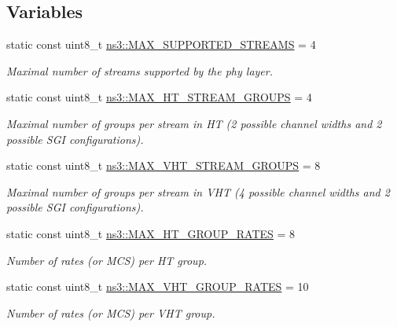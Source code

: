 \subsection*{Variables}
\begin{DoxyCompactItemize}
\item 
static const uint8\+\_\+t \hyperlink{namespacens3_ae11d9ba4764a3d93a0e9a15c40c94db1}{ns3\+::\+M\+A\+X\+\_\+\+S\+U\+P\+P\+O\+R\+T\+E\+D\+\_\+\+S\+T\+R\+E\+A\+MS} = 4
\begin{DoxyCompactList}\small\item\em Maximal number of streams supported by the phy layer. \end{DoxyCompactList}\item 
static const uint8\+\_\+t \hyperlink{namespacens3_a90ea346dc88400cf34c4379808fd35ba}{ns3\+::\+M\+A\+X\+\_\+\+H\+T\+\_\+\+S\+T\+R\+E\+A\+M\+\_\+\+G\+R\+O\+U\+PS} = 4
\begin{DoxyCompactList}\small\item\em Maximal number of groups per stream in HT (2 possible channel widths and 2 possible S\+GI configurations). \end{DoxyCompactList}\item 
static const uint8\+\_\+t \hyperlink{namespacens3_a10ef82db566ad2572e2374fd1cbbfa75}{ns3\+::\+M\+A\+X\+\_\+\+V\+H\+T\+\_\+\+S\+T\+R\+E\+A\+M\+\_\+\+G\+R\+O\+U\+PS} = 8
\begin{DoxyCompactList}\small\item\em Maximal number of groups per stream in V\+HT (4 possible channel widths and 2 possible S\+GI configurations). \end{DoxyCompactList}\item 
static const uint8\+\_\+t \hyperlink{namespacens3_a09e2444bef75884650d2d5a53b6cd489}{ns3\+::\+M\+A\+X\+\_\+\+H\+T\+\_\+\+G\+R\+O\+U\+P\+\_\+\+R\+A\+T\+ES} = 8
\begin{DoxyCompactList}\small\item\em Number of rates (or M\+CS) per HT group. \end{DoxyCompactList}\item 
static const uint8\+\_\+t \hyperlink{namespacens3_a55aceb8d2eb4d90f4501847187fbe2a6}{ns3\+::\+M\+A\+X\+\_\+\+V\+H\+T\+\_\+\+G\+R\+O\+U\+P\+\_\+\+R\+A\+T\+ES} = 10
\begin{DoxyCompactList}\small\item\em Number of rates (or M\+CS) per V\+HT group. \end{DoxyCompactList}\item 

\end{DoxyCompactItemize}
